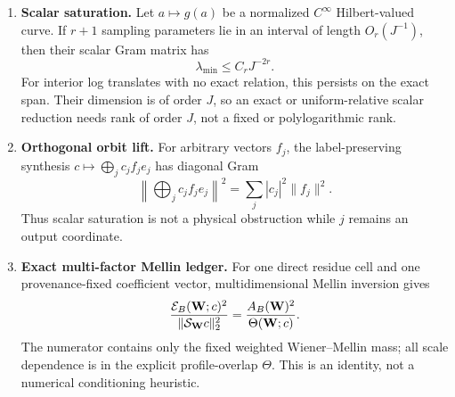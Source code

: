 \begin{enumerate}[label=\textup{(R\arabic*)},leftmargin=3.2em]
 \item \textbf{Scalar saturation.}
 Let \(a\mapsto g(a)\) be a normalized \(C^\infty\) Hilbert-valued
 curve.  If \(r+1\) sampling parameters lie in an interval of length
 \(O_r(J^{-1})\), then their scalar Gram matrix has
 \begin{equation}
  \lambda_{\min}\le C_rJ^{-2r}.
  \label{eq:tpc52-intro-saturation}
 \end{equation}
 For interior log translates with no exact relation, this persists on
 the exact span.  Their dimension is of order \(J\), so an exact or
 uniform-relative scalar reduction needs rank of order \(J\), not a
 fixed or polylogarithmic rank.

 \item \textbf{Orthogonal orbit lift.}
 For arbitrary vectors \(f_j\), the label-preserving synthesis
 \(c\mapsto\bigoplus_jc_jf_j e_j\) has diagonal Gram
 \begin{equation}
  \left\|\bigoplus_jc_jf_je_j\right\|^2
  =\sum_j|c_j|^2\|f_j\|^2.
  \label{eq:tpc52-intro-orthogonal-lift}
 \end{equation}
 Thus scalar saturation is not a physical obstruction while \(j\)
 remains an output coordinate.

 \item \textbf{Exact multi-factor Mellin ledger.}
 For one direct residue cell and one provenance-fixed coefficient
 vector, multidimensional Mellin inversion gives
 \begin{equation}
  \frac{\mathcal E_B(\mathbf W;c)^2}
       {\|\mathcal S_{\mathbf W}c\|_2^2}
  =\frac{A_B(\mathbf W)^2}{\Theta(\mathbf W;c)}.
  \label{eq:tpc52-intro-exact-ledger}
 \end{equation}
 The numerator contains only the fixed weighted Wiener--Mellin mass;
 all scale dependence is in the explicit profile-overlap
 \(\Theta\).  This is an identity, not a numerical conditioning
 heuristic.


\end{enumerate}
